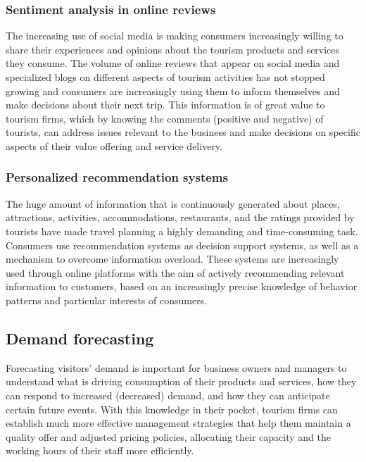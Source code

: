\documentclass[
  letterpaper,
  DIV=11,
  numbers=noendperiod]{scrreprt}
\begin{document}
\hypertarget{sentiment-analysis-in-online-reviews}{%
\subsubsection{Sentiment analysis in online
reviews}\label{sentiment-analysis-in-online-reviews}}

The increasing use of social media is making consumers increasingly
willing to share their experiences and opinions about the tourism
products and services they consume. The volume of online reviews that
appear on social media and specialized blogs on different aspects of
tourism activities has not stopped growing and consumers are
increasingly using them to inform themselves and make decisions about
their next trip. This information is of great value to tourism firms,
which by knowing the comments (positive and negative) of tourists, can
address issues relevant to the business and make decisions on specific
aspects of their value offering and service delivery.

\hypertarget{personalized-recommendation-systems}{%
\subsubsection{Personalized recommendation
systems}\label{personalized-recommendation-systems}}

The huge amount of information that is continuously generated about
places, attractions, activities, accommodations, restaurants, and the
ratings provided by tourists have made travel planning a highly
demanding and time-consuming task. Consumers use recommendation systems
as decision support systems, as well as a mechanism to overcome
information overload. These systems are increasingly used through online
platforms with the aim of actively recommending relevant information to
customers, based on an increasingly precise knowledge of behavior
patterns and particular interests of consumers.

\hypertarget{demand-forecasting}{%
\subsection{Demand forecasting}\label{demand-forecasting}}

Forecasting visitors' demand is important for business owners and
managers to understand what is driving consumption of their products and
services, how they can respond to increased (decreased) demand, and how
they can anticipate certain future events. With this knowledge in their
pocket, tourism firms can establish much more effective management
strategies that help them maintain a quality offer and adjusted pricing
policies, allocating their capacity and the working hours of their staff
more efficiently.
\end{document}
